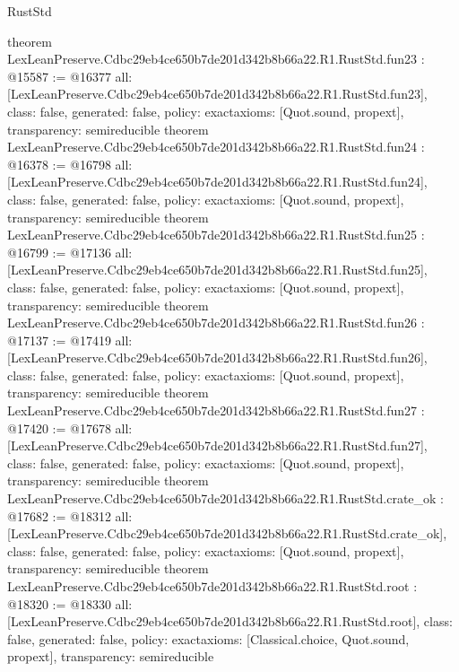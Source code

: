 \begin{lexlean}{RustStd}
\begin{coremodule}
{}
theorem LexLeanPreserve.Cdbc29eb4ce650b7de201d342b8b66a22.R1.RustStd.fun23 : @15587 := @16377 {
  all: [LexLeanPreserve.Cdbc29eb4ce650b7de201d342b8b66a22.R1.RustStd.fun23],
  class: false,
  generated: false,
  policy: exact{axioms: [Quot.sound, propext]},
  transparency: semireducible
}
theorem LexLeanPreserve.Cdbc29eb4ce650b7de201d342b8b66a22.R1.RustStd.fun24 : @16378 := @16798 {
  all: [LexLeanPreserve.Cdbc29eb4ce650b7de201d342b8b66a22.R1.RustStd.fun24],
  class: false,
  generated: false,
  policy: exact{axioms: [Quot.sound, propext]},
  transparency: semireducible
}
theorem LexLeanPreserve.Cdbc29eb4ce650b7de201d342b8b66a22.R1.RustStd.fun25 : @16799 := @17136 {
  all: [LexLeanPreserve.Cdbc29eb4ce650b7de201d342b8b66a22.R1.RustStd.fun25],
  class: false,
  generated: false,
  policy: exact{axioms: [Quot.sound, propext]},
  transparency: semireducible
}
theorem LexLeanPreserve.Cdbc29eb4ce650b7de201d342b8b66a22.R1.RustStd.fun26 : @17137 := @17419 {
  all: [LexLeanPreserve.Cdbc29eb4ce650b7de201d342b8b66a22.R1.RustStd.fun26],
  class: false,
  generated: false,
  policy: exact{axioms: [Quot.sound, propext]},
  transparency: semireducible
}
theorem LexLeanPreserve.Cdbc29eb4ce650b7de201d342b8b66a22.R1.RustStd.fun27 : @17420 := @17678 {
  all: [LexLeanPreserve.Cdbc29eb4ce650b7de201d342b8b66a22.R1.RustStd.fun27],
  class: false,
  generated: false,
  policy: exact{axioms: [Quot.sound, propext]},
  transparency: semireducible
}
theorem LexLeanPreserve.Cdbc29eb4ce650b7de201d342b8b66a22.R1.RustStd.crate_ok : @17682 := @18312 {
  all: [LexLeanPreserve.Cdbc29eb4ce650b7de201d342b8b66a22.R1.RustStd.crate_ok],
  class: false,
  generated: false,
  policy: exact{axioms: [Quot.sound, propext]},
  transparency: semireducible
}
theorem LexLeanPreserve.Cdbc29eb4ce650b7de201d342b8b66a22.R1.RustStd.root : @18320 := @18330 {
  all: [LexLeanPreserve.Cdbc29eb4ce650b7de201d342b8b66a22.R1.RustStd.root],
  class: false,
  generated: false,
  policy: exact{axioms: [Classical.choice, Quot.sound, propext]},
  transparency: semireducible
}


\end{coremodule}
\end{lexlean}
